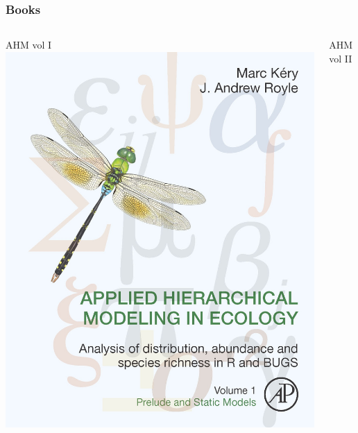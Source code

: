 \documentclass[color=usenames,dvipsnames]{beamer}\usepackage[]{graphicx}\usepackage[]{color}
\begin{document}
\begin{frame}
  \frametitle{Books}
  \begin{columns}
    \begin{column}{0.33\textwidth}
      \centering
      AHM vol I\\
      \includegraphics[width=\textwidth]{figs/KeryRoyleBookCover} \\
    \end{column}
    \begin{column}{0.33\textwidth}
      \centering
      AHM vol II\\

\end{column}
\end{columns}
\end{frame}
\end{document}
